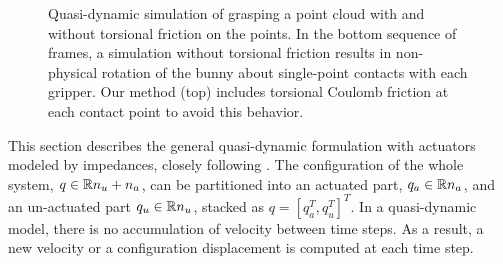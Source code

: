 \begin{figure}[t]
\centering 
{}
\caption{Quasi-dynamic simulation of grasping a point cloud with and without torsional friction on the points. In the bottom sequence of frames, a simulation without torsional friction results in non-physical rotation of the bunny about single-point contacts with each gripper. Our method (top) includes torsional Coulomb friction at each contact point to avoid this behavior. %
}
\label{fig:bunny_drop2}
\end{figure}


This section describes the general quasi-dynamic formulation with actuators modeled by impedances, closely following \cite{pang2018,pang2021}. The configuration of the whole system, $q \in \mathbb{R}{n_u + n_a}$, can be partitioned into an actuated part, $q_a \in \mathbb{R}{n_a}$, and an un-actuated part $q_u \in \mathbb{R}{n_u}$, stacked as $q = [q_a^T, q_u^T]^T$. In a quasi-dynamic model, there is no accumulation of velocity between time steps. As a result, a new velocity or a configuration displacement is computed at each time step. 

